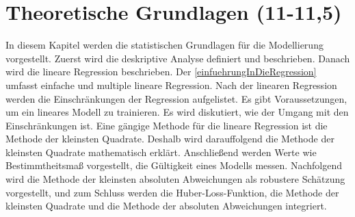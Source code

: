 \newpage
\section{Theoretische Grundlagen (11-11,5)}
\label{TheoretischeGrundlagen}
In diesem Kapitel werden die statistischen Grundlagen für die Modellierung vorgestellt. Zuerst wird die deskriptive Analyse definiert und beschrieben. Danach wird die lineare Regression beschrieben. Der \autoref{einfuehrungInDieRegression} umfasst einfache und multiple lineare Regression. Nach der linearen Regression werden die Einschränkungen der Regression aufgelistet. Es gibt Voraussetzungen, um ein lineares Modell zu trainieren. Es wird diskutiert, wie der Umgang mit den Einschränkungen ist. Eine gängige Methode für die lineare Regression ist die Methode der kleinsten Quadrate. Deshalb wird darauffolgend die Methode der kleinsten Quadrate mathematisch erklärt. Anschließend werden Werte wie Bestimmtheitsmaß vorgestellt, die Gültigkeit eines Modells messen. Nachfolgend wird die Methode der kleinsten absoluten Abweichungen als robustere Schätzung vorgestellt, und zum Schluss werden die Huber-Loss-Funktion, die Methode der kleinsten Quadrate und die Methode der absoluten Abweichungen integriert.
